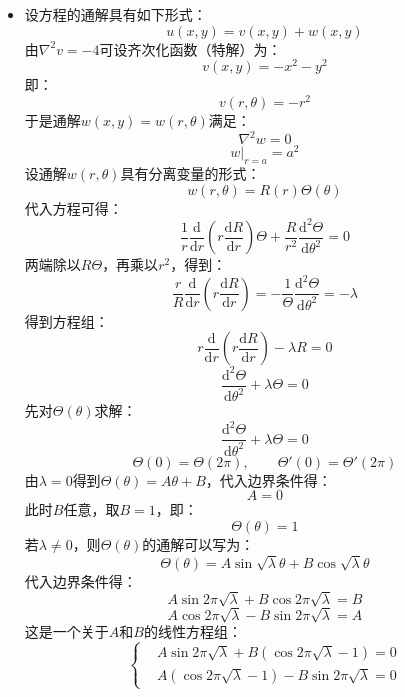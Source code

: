 \documentclass[fontset=windows]{ctexart}
\begin{document}
\begin{itemize}
    最后得解：
    \begin{align*}
    u(r,\theta,z)
    &= \frac{4V}{\pi}\sum_{n = 1}^{\infty}\frac{1}{2n+1}\left(\frac{r}{a}\right)^{2n+1}\sin{(2n+1)\theta} \\
    &= \frac{2V}{\pi}\arctan\frac{2ar\sin\theta}{a^2 - r^2}
    \end{align*}
    \bigskip

    \item[4.(1)]
    设方程的通解具有如下形式：
    \[
    u(x,y) = v(x,y) + w(x,y)
    \]
    由$\nabla^2 v = -4$可设齐次化函数（特解）为：
    \[
    v(x,y) = -x^2 - y^2
    \]
    即：
    \[
    v(r,\theta) = -r^2
    \]
    于是通解$w(x,y) = w(r,\theta)$满足：
    \[
    \nabla^2 w = 0
    \]
    \[
    \left. w\right|_{r = a} = a^2
    \]
    设通解$w(r,\theta)$具有分离变量的形式：
    \[
    w(r,\theta) = R(r)\varTheta(\theta)
    \]
    代入方程可得：
    \[
    \frac{1}{r}\frac{\mathrm{d}}{\mathrm{d}r}\left(r\frac{\mathrm{d}R}{\mathrm{d} r}\right)\varTheta + \frac{R}{r^2}\frac{\mathrm{d}^2 \varTheta}{\mathrm{d}\theta^2} = 0
    \]
    两端除以${R\varTheta}$，再乘以$r^2$，得到：
    \[
    \frac{r}{R}\frac{\mathrm{d}}{\mathrm{d}r}\left(r\frac{\mathrm{d}R}{\mathrm{d} r}\right) = -\frac{1}{\varTheta}\frac{\mathrm{d}^2 \varTheta}{\mathrm{d}\theta^2} = -\lambda
    \]
    得到方程组：
    \[
    r\frac{\mathrm{d}}{\mathrm{d}r}\left(r\frac{\mathrm{d}R}{\mathrm{d} r}\right) - \lambda R = 0
    \]
    \[
    \frac{\mathrm{d}^2 \varTheta}{\mathrm{d}\theta^2} + \lambda\varTheta = 0
    \]
    先对$\varTheta(\theta)$求解：
    \[
    \frac{\mathrm{d}^2 \varTheta}{\mathrm{d}\theta^2} + \lambda\varTheta = 0
    \]
    \[
    \varTheta(0) = \varTheta(2\pi),\qquad
    \varTheta'(0) = \varTheta'(2\pi)
    \]
    由$\lambda = 0$得到$\varTheta(\theta) = A\theta + B$，代入边界条件得：
    \[
    A = 0
    \]
    此时$B$任意，取$B = 1$，即：
    \[
    \varTheta(\theta) = 1
    \]
    若$\lambda \neq 0$，则$\varTheta(\theta)$的通解可以写为：
    \[
    \varTheta(\theta) = A\sin\sqrt\lambda\theta + B\cos\sqrt\lambda\theta
    \]
    代入边界条件得：
    \[
    A\sin2\pi\sqrt{\lambda} + B\cos2\pi\sqrt{\lambda} = B
    \]
    \[
    A\cos2\pi\sqrt{\lambda} - B\sin2\pi\sqrt{\lambda} = A
    \]
    这是一个关于$A$和$B$的线性方程组：
    \[
    \left\{
    \begin{aligned}
        & A\sin2\pi\sqrt{\lambda} + B(\cos2\pi\sqrt{\lambda} - 1) = 0 \\
        & A(\cos2\pi\sqrt{\lambda} - 1) - B\sin2\pi\sqrt{\lambda} = 0
    \end{aligned}
\]
\end{itemize}
\end{document}
